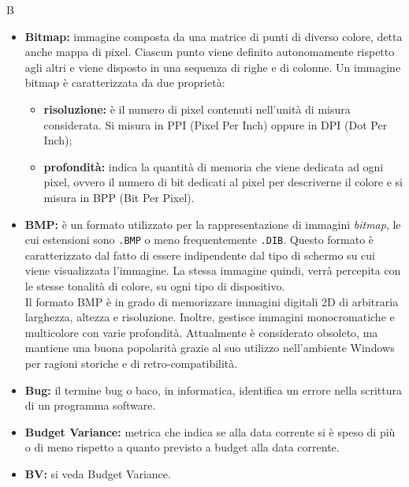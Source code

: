 \Huge B
\normalsize
\begin{itemize}
\item\textbf{Bitmap:} immagine composta da una matrice di punti di diverso colore, detta anche mappa di pixel\glossario{}. Ciascun punto viene definito autonomamente rispetto agli altri e viene disposto in una sequenza di righe e di colonne. Un immagine bitmap\glossario{} è caratterizzata da due proprietà:
\begin{itemize}
\item\textbf{risoluzione:} è il numero di pixel\glossario{} contenuti nell'unità di misura considerata. Si misura in PPI (Pixel\glossario{} Per Inch) oppure in DPI (Dot Per Inch);
\item\textbf{profondità:} indica la quantità di memoria che viene dedicata ad ogni pixel\glossario{}, ovvero il numero di bit dedicati al pixel\glossario{} per descriverne il colore e si misura in BPP (Bit Per Pixel\glossario{}).
\end{itemize}

\item\textbf{BMP:} è un formato utilizzato per la rappresentazione di immagini \textit{bitmap}\glossario{}, le cui estensioni sono \verb!.BMP! o meno frequentemente \verb!.DIB!. Questo formato è caratterizzato dal fatto di essere indipendente dal tipo di schermo su cui viene visualizzata l'immagine. La stessa immagine quindi, verrà percepita con le stesse tonalità di colore, su ogni tipo di dispositivo.
\\Il formato BMP è in grado di memorizzare immagini digitali 2D di arbitraria larghezza, altezza e risoluzione. Inoltre, gestisce immagini monocromatiche e multicolore con varie profondità. Attualmente è considerato obsoleto, ma mantiene una buona popolarità grazie al suo utilizzo nell'ambiente Windows\glossario{} per ragioni storiche e di retro-compatibilità.
\item \textbf{Bug:} il termine bug o baco, in informatica, identifica un errore nella scrittura di un programma software.

\item\textbf{Budget Variance:} metrica che indica se alla data corrente si è speso di più o di meno rispetto a quanto previsto a budget alla data corrente.

\item\textbf{BV:} si veda Budget Variance\g{}.
\end{itemize}
\pagebreak

